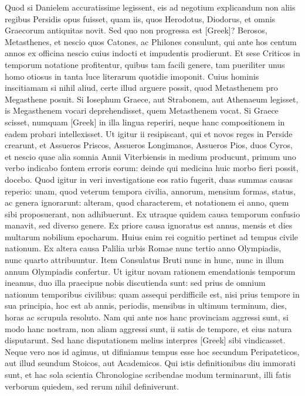Quod si Danielem accuratissime legissent,
eis ad negotium explicandum non aliis regibus Persidis opus fuisset,
quam iis, quos Herodotus, Diodorus, et omnis Graecorum antiquitas
novit.
Sed quo non progressa est \textgreek{[Greek]}?
Berosos, Metasthenes, et
nescio quos Catones, ac Philones consulunt, qui ante hos centum annos
ex officina nescio cuius indocti et impudentis prodierunt.
Et sese
Criticos in temporum notatione profitentur, quibus tam facili genere,
tam pueriliter unus homo otiosus in tanta luce literarum quotidie imoponit.
Cuius hominis inscitiamam si nihil aliud, certe illud arguere
 possit, quod
Metasthenem pro Megasthene posuit.
Si Iosephum Graece, aut Strabonem,
aut Athenaeum legisset, is Megasthenem vocari deprehendisset,
quem Metasthenem vocat.
Si Graece scisset, numquam \textgreek{[Greek]} in illa
lingua reperiri, neque hanc compositionem in eadem probari intellexisset.
Ut igitur ii resipiscant, qui et novos reges in Perside crearunt,
et Assueros Priscos, Assueros Longimanos, Assueros Pios, duos Cyros,
et nescio quae alia somnia Annii Viterbiensis in medium producunt,
primum uno verbo indicabo fontem erroris eorum: deinde qui medicina
huic morbo fieri possit, docebo.
Quod igitur in veri investigatione
eos ratio fugerit, duas summas causas reperio: unam, quod veterum
tempora civilia, annorum, mensium formas, status, ac genera ignorarunt:
alteram, quod characterem, et notationem ei anno, quem sibi
proposuerant, non adhibuerunt.
Ex utraque quidem causa temporum
confusio manavit, sed diverso genere.
Ex priore causa ignoratus est
annus, mensis et dies multarum nobilium epocharum.
Huius enim
rei cognitio pertinet ad tempus civile nationum.
Ex altera causa Palilia
urbis Romae nunc tertio anno Olympiadis, nunc quarto attribuuntur.
Item Consulatus Bruti nunc in hunc, nunc in illum annum
Olympiadis confertur.
Ut igitur novam rationem emendationis temporum
ineamus, duo illa praecipue nobis discutienda sunt: sed prius
de omnium nationum temporibus civilibus: quam assequi perdifficile
est, nisi prius tempore in sua principia, hoc est ab annis, periodis,
mensibus in ultimum terminum, dies, horas ac scrupula resoluto.
Nam qui ante nos hanc provinciam aggressi sunt, si modo hanc nostram,
non aliam aggressi sunt, ii satis de tempore, et eius natura
disputarunt.
Sed hanc disputationem melius interpres \textgreek{[Greek]}
sibi vindicasset.
Neque vero nos id agimus, ut difiniamus
tempus esse hoc secundum Peripateticos, aut illud seundum Stoicos,
aut Academicos.
Qui istis definitionibus diu immorati sunt, et hac
sola scientia Chronologiae scribendae modum terminarunt, illi fatis
verborum quiedem, sed rerum nihil definiverunt.

